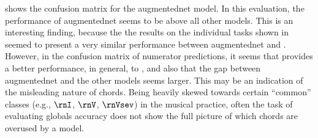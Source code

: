 

 shows the
confusion matrix for the \gls{augmentednet} model. In this
evaluation, the performance of \gls{augmentednet} seems to
be above all other models. This is an interesting finding,
because the the results on the individual tasks shown in
 seemed to present a very similar
performance between \gls{augmentednet} and
\textcite{micchi2021deep}. However, in the confusion matrix
of numerator predictions, it seems that
\textcite{mcleod2021modular} provides a better performance,
in general, to \textcite{micchi2021deep}, and also that the
gap between \gls{augmentednet} and the other models seems
larger. This may be an indication of the misleading nature
of chords. Being heavily skewed towards certain ``common''
classes (e.g., $\rnI$, $\rnV$, $\rnVsev$) in the musical
practice, often the task of evaluating globals accuracy does
not show the full picture of which chords are overused by a
model.


